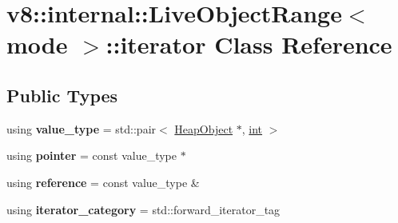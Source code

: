 \hypertarget{classv8_1_1internal_1_1LiveObjectRange_1_1iterator}{}\section{v8\+:\+:internal\+:\+:Live\+Object\+Range$<$ mode $>$\+:\+:iterator Class Reference}
\label{classv8_1_1internal_1_1LiveObjectRange_1_1iterator}
\subsection*{Public Types}
\begin{DoxyCompactItemize}
\item 
\mbox{\label{classv8_1_1internal_1_1LiveObjectRange_1_1iterator_ad1d52b96c91d26270ed89625ebb8877d}} 
using {\bfseries value\+\_\+type} = std\+::pair$<$ \mbox{\hyperlink{classv8_1_1internal_1_1HeapObject}{Heap\+Object}} $\ast$, \mbox{\hyperlink{classint}{int}} $>$
\item 
\mbox{\label{classv8_1_1internal_1_1LiveObjectRange_1_1iterator_a38f77d369e1acfe1ed38622a4fac783b}} 
using {\bfseries pointer} = const value\+\_\+type $\ast$
\item 
\mbox{\label{classv8_1_1internal_1_1LiveObjectRange_1_1iterator_a4b5ded86241152b4309d359f4b989909}} 
using {\bfseries reference} = const value\+\_\+type \&
\item 
\mbox{\label{classv8_1_1internal_1_1LiveObjectRange_1_1iterator_ae18367649df808097f50bb161c6496ff}} 
using {\bfseries iterator\+\_\+category} = std\+::forward\+\_\+iterator\+\_\+tag
\end{DoxyCompactItemize}
